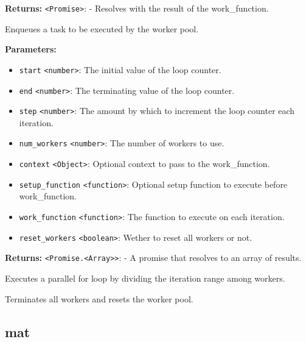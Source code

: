 \documentclass[12pt,a4paper]{article}
\begin{document}
\noindent \textbf{Returns:} \texttt{<Promise>}: - Resolves with the result of the work\_function.

\noindent Enqueues a task to be executed by the worker pool.

\vspace{5mm}
\noindent {}


\noindent \textbf{Parameters:}
\begin{itemize}
  \item \texttt{start} \texttt{<number>}: The initial value of the loop counter.
  \item \texttt{end} \texttt{<number>}: The terminating value of the loop counter.
  \item \texttt{step} \texttt{<number>}: The amount by which to increment the loop counter each iteration.
  \item \texttt{num\_workers} \texttt{<number>}: The number of workers to use.
  \item \texttt{context} \texttt{<Object>}: Optional context to pass to the work\_function.
  \item \texttt{setup\_function} \texttt{<function>}: Optional setup function to execute before work\_function.
  \item \texttt{work\_function} \texttt{<function>}: The function to execute on each iteration.
  \item \texttt{reset\_workers} \texttt{<boolean>}: Wether to reset all workers or not.
\end{itemize}

\noindent \textbf{Returns:} \texttt{<Promise.<Array>>}: - A promise that resolves to an array of results.

\noindent Executes a parallel for loop by dividing the iteration range among workers.

\vspace{5mm}
\noindent {}


\noindent Terminates all workers and resets the worker pool.


\subsection{mat}
\vspace{5mm}
\noindent {}
\end{document}

